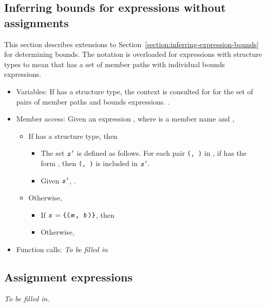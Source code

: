 \subsection{Inferring bounds for expressions without assignments}

This section describes extensions to Section~\ref{section:inferring-expression-bounds} for
determining bounds.   The notation  is overloaded for expressions
with structure types to mean that  has a set of member paths with individual bounds expressions.
\begin{itemize}
\item Variables: If  has a structure type, the context is consulted for  for
the set  of pairs of member paths and bounds expressions.  .
\item Member access: Given an expression , where  is 
a member name and ,
\begin{itemize}
\item If  has a structure type, then
\begin{itemize}
\item The set $\texttt{\textit{s}}^{\prime}$ is defined as follows.  For each pair 
      \texttt{(, )} in , if  has the form 
      , then \texttt{(, )} is
      included in $\texttt{\textit{s}}^\prime$.
\item  Given $\texttt{\textit{s}}^\prime$, .
\end{itemize}
\item Otherwise,
\begin{itemize}
\item If $\texttt{\textit{s}} = \texttt{\{(\texttt{\textit{m}}, \texttt{\textit{b}})\}}$, then 
\item Otherwise, 
\end{itemize}
\end{itemize}
\item Function calls: {\em To be filled in}
\end{itemize}

\subsection{Assignment expressions}

{\em To be filled in.}

